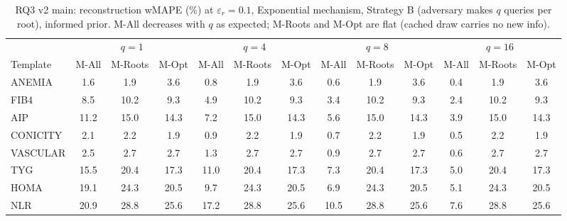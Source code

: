 \begin{table}[t]
\centering
\setlength{\tabcolsep}{3pt}
\footnotesize
\caption{RQ3 v2 main: reconstruction wMAPE (\%) at $\varepsilon_r=0.1$, Exponential mechanism, Strategy B (adversary makes $q$ queries per root), informed prior. M-All decreases with $q$ as expected; M-Roots and M-Opt are flat (cached draw carries no new info).}
\label{tab:rq3_v2_main_informed}
\begin{tabular}{lcccccccccccc}
\toprule
 & \multicolumn{3}{c}{$q=1$} & \multicolumn{3}{c}{$q=4$} & \multicolumn{3}{c}{$q=8$} & \multicolumn{3}{c}{$q=16$} \\
\cmidrule(lr){2-4} \cmidrule(lr){5-7} \cmidrule(lr){8-10} \cmidrule(lr){11-13}
Template & M-All & M-Roots & M-Opt & M-All & M-Roots & M-Opt & M-All & M-Roots & M-Opt & M-All & M-Roots & M-Opt \\
\midrule
ANEMIA & 1.6 & 1.9 & 3.6 & 0.8 & 1.9 & 3.6 & 0.6 & 1.9 & 3.6 & 0.4 & 1.9 & 3.6 \\
FIB4 & 8.5 & 10.2 & 9.3 & 4.9 & 10.2 & 9.3 & 3.4 & 10.2 & 9.3 & 2.4 & 10.2 & 9.3 \\
AIP & 11.2 & 15.0 & 14.3 & 7.2 & 15.0 & 14.3 & 5.6 & 15.0 & 14.3 & 3.9 & 15.0 & 14.3 \\
CONICITY & 2.1 & 2.2 & 1.9 & 0.9 & 2.2 & 1.9 & 0.7 & 2.2 & 1.9 & 0.5 & 2.2 & 1.9 \\
VASCULAR & 2.5 & 2.7 & 2.7 & 1.3 & 2.7 & 2.7 & 0.9 & 2.7 & 2.7 & 0.6 & 2.7 & 2.7 \\
TYG & 15.5 & 20.4 & 17.3 & 11.0 & 20.4 & 17.3 & 7.3 & 20.4 & 17.3 & 5.0 & 20.4 & 17.3 \\
HOMA & 19.1 & 24.3 & 20.5 & 9.7 & 24.3 & 20.5 & 6.9 & 24.3 & 20.5 & 5.1 & 24.3 & 20.5 \\
NLR & 20.9 & 28.8 & 25.6 & 17.2 & 28.8 & 25.6 & 10.5 & 28.8 & 25.6 & 7.6 & 28.8 & 25.6 \\
\bottomrule
\end{tabular}
\end{table}

